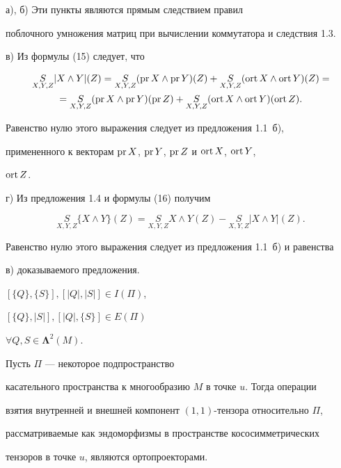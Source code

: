 \begin{pf} а), б) Эти пункты являются прямым следствием правил


поблочного умножения матриц при вычислении коммутатора и следствия 1.3.


в) Из формулы (15) следует, что


\begin{gather*}


\underset{X,Y,Z}{S}{}|X\land Y|(Z)=\underset{X,Y,Z}{S}{}(\pr X\land


\pr Y)(Z)+\underset{X,Y,Z}{S}{}(\ort X\land \ort Y)(Z)=\\


=\underset{X,Y,Z}{S}{}(\pr X\land \pr Y)(\pr Z)+\underset{X,Y,Z}{S}{}


(\ort X \land \ort Y)(\ort Z).


\end{gather*}


Равенство нулю этого выражения следует из предложения 1.1~б),


примененного к векторам $\operatorname{pr} X$, $\operatorname{pr} Y$, $\operatorname{pr} Z$ и $\operatorname{ort} X$, $\operatorname{ort} Y$,


$\operatorname{ort} Z$.





г) Из предложения 1.4 и формулы (16) получим


$$


\underset{X,Y,Z}{S}{}\{ X\land Y\} (Z)=\underset{X,Y,Z}{S}{}X\land Y(Z)-


\underset{X,Y,Z}{S}{}|X\land Y|(Z).


$$


Равенство нулю этого выражения следует из предложения 1.1~б) и равенства


в) доказываемого предложения.


\end{pf}





\begin{cors} $[\{ Q\} ,\{ S\} ],[|Q|,|S|]\in I(\Pi )$,


$[\{ Q\} ,|S|],[|Q|,\{ S\} ]\in E(\Pi )$


$\forall Q,S\in \boldsymbol\Lambda ^2(M)$.


\end{cors}





\begin{props} Пусть $\Pi$ --- некоторое подпространство


касательного пространства к многообразию $M$ в точке $u$. Тогда операции


взятия внутренней и внешней компонент $(1,1)$-тензора относительно $\Pi$,


рассматриваемые как эндоморфизмы в пространстве кососимметрических


тензоров в точке $u$, являются ортопроекторами.


\end{props}





